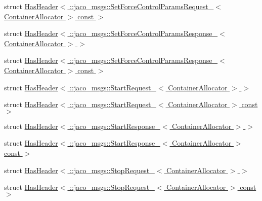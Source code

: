 \begin{DoxyCompactItemize}
\item 
struct \hyperlink{structros_1_1message__traits_1_1HasHeader_3_01_1_1jaco__msgs_1_1SetForceControlParamsRequest___3ac67f2ab7236d5242eb8dbcd0649c942}{Has\+Header$<$ \+::jaco\+\_\+msgs\+::\+Set\+Force\+Control\+Params\+Request\+\_\+$<$ Container\+Allocator $>$ const  $>$}
\item 
struct \hyperlink{structros_1_1message__traits_1_1HasHeader_3_01_1_1jaco__msgs_1_1SetForceControlParamsResponse___e0a362bab593573c0d2c1270a9617373}{Has\+Header$<$ \+::jaco\+\_\+msgs\+::\+Set\+Force\+Control\+Params\+Response\+\_\+$<$ Container\+Allocator $>$ $>$}
\item 
struct \hyperlink{structros_1_1message__traits_1_1HasHeader_3_01_1_1jaco__msgs_1_1SetForceControlParamsResponse___1966c7230658ad242a89337f70355e33}{Has\+Header$<$ \+::jaco\+\_\+msgs\+::\+Set\+Force\+Control\+Params\+Response\+\_\+$<$ Container\+Allocator $>$ const  $>$}
\item 
struct \hyperlink{structros_1_1message__traits_1_1HasHeader_3_01_1_1jaco__msgs_1_1StartRequest___3_01ContainerAllocator_01_4_01_4}{Has\+Header$<$ \+::jaco\+\_\+msgs\+::\+Start\+Request\+\_\+$<$ Container\+Allocator $>$ $>$}
\item 
struct \hyperlink{structros_1_1message__traits_1_1HasHeader_3_01_1_1jaco__msgs_1_1StartRequest___3_01ContainerAllocator_01_4_01const_01_01_4}{Has\+Header$<$ \+::jaco\+\_\+msgs\+::\+Start\+Request\+\_\+$<$ Container\+Allocator $>$ const  $>$}
\item 
struct \hyperlink{structros_1_1message__traits_1_1HasHeader_3_01_1_1jaco__msgs_1_1StartResponse___3_01ContainerAllocator_01_4_01_4}{Has\+Header$<$ \+::jaco\+\_\+msgs\+::\+Start\+Response\+\_\+$<$ Container\+Allocator $>$ $>$}
\item 
struct \hyperlink{structros_1_1message__traits_1_1HasHeader_3_01_1_1jaco__msgs_1_1StartResponse___3_01ContainerAllocator_01_4_01const_01_01_4}{Has\+Header$<$ \+::jaco\+\_\+msgs\+::\+Start\+Response\+\_\+$<$ Container\+Allocator $>$ const  $>$}
\item 
struct \hyperlink{structros_1_1message__traits_1_1HasHeader_3_01_1_1jaco__msgs_1_1StopRequest___3_01ContainerAllocator_01_4_01_4}{Has\+Header$<$ \+::jaco\+\_\+msgs\+::\+Stop\+Request\+\_\+$<$ Container\+Allocator $>$ $>$}
\item 
struct \hyperlink{structros_1_1message__traits_1_1HasHeader_3_01_1_1jaco__msgs_1_1StopRequest___3_01ContainerAllocator_01_4_01const_01_01_4}{Has\+Header$<$ \+::jaco\+\_\+msgs\+::\+Stop\+Request\+\_\+$<$ Container\+Allocator $>$ const  $>$}

\end{DoxyCompactItemize}
